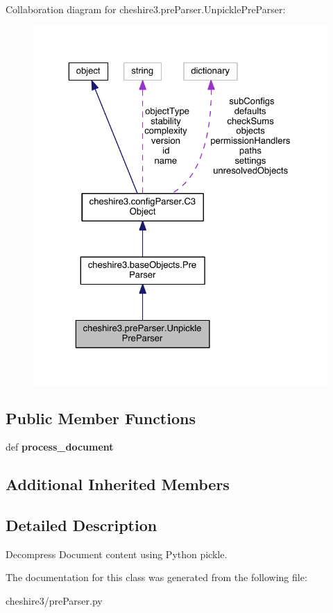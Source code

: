 Collaboration diagram for cheshire3.\-pre\-Parser.\-Unpickle\-Pre\-Parser\-:
\nopagebreak
\begin{figure}[H]
\begin{center}
\leavevmode
\includegraphics[width=325pt]{classcheshire3_1_1pre_parser_1_1_unpickle_pre_parser__coll__graph}
\end{center}
\end{figure}
\subsection*{Public Member Functions}
\begin{DoxyCompactItemize}
\item 
\hypertarget{classcheshire3_1_1pre_parser_1_1_unpickle_pre_parser_a77b5df1344fac669bb70d75675c848e7}{def {\bfseries process\-\_\-document}}\label{classcheshire3_1_1pre_parser_1_1_unpickle_pre_parser_a77b5df1344fac669bb70d75675c848e7}

\end{DoxyCompactItemize}
\subsection*{Additional Inherited Members}


\subsection{Detailed Description}
\begin{DoxyVerb}Decompress Document content using Python pickle.\end{DoxyVerb}
 

The documentation for this class was generated from the following file\-:\begin{DoxyCompactItemize}
\item 
cheshire3/pre\-Parser.\-py\end{DoxyCompactItemize}
